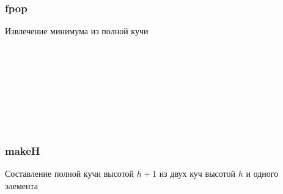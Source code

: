 \begin{frame}
  \frametitle{fpop}
Извлечение минимума из полной кучи
\begin{code}\>\<%
\\
\>[0]\<[2]%
\>[2] \AgdaSymbol{:}  \AgdaSymbol{\{} \AgdaSymbol{\}}    \AgdaSymbol{(} \AgdaSymbol{)} \<%
\\
\>[2]\<[4]%
\>[4] \<%
\\
\>[2]\<[4]%
\>[4]\AgdaSymbol{(} \AgdaSymbol{(} \AgdaSymbol{)} \<[20]%
\>[20]\<%
\\
\>[4]\<[7]%
\>[7]   \AgdaSymbol{(}  \AgdaSymbol{(} \AgdaSymbol{)} \AgdaSymbol{)}  \AgdaSymbol{(}  \AgdaSymbol{))}\<%
\\
\>[0]\<[4]%
\>[4]\AgdaSymbol{)}\<%
\\
\>[0]\<[4]%
\>[4]\AgdaSymbol{(}   \AgdaSymbol{)}\<%
\\
\>\<\end{code}
\end{frame}

 
\begin{frame}
  \frametitle{makeH}
Составление полной кучи высотой $h+1$ из двух куч высотой $h$ и одного элемента
\begin{code}\>\<%
\\
\>[0]\<[2]%
\>[2] \AgdaSymbol{:}  \AgdaSymbol{\{}  \AgdaSymbol{\}}  \AgdaSymbol{(} \AgdaSymbol{:} \AgdaSymbol{)}\<%
\\
\>[2]\<[4]%
\>[4]         \<%
\\
\>[2]\<[4]%
\>[4]  \AgdaSymbol{(}   \AgdaSymbol{(}\AgdaInductiveConstructor{\#} \AgdaSymbol{))} \AgdaSymbol{(} \AgdaSymbol{)} \<%
\\
\>\<\end{code}
\end{frame}

